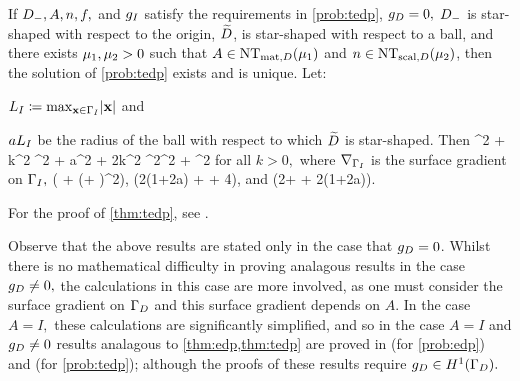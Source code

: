 \label{thm:tedp}
If $D_{-}, A, n, f,$ and $g_{I}$ satisfy the requirements in \cref{prob:tedp}, $g_{D} = 0,$ $D_{-}$ is star-shaped with respect to the origin, $\widetilde{D}$, is star-shaped with respect to a ball, and there exists $\mu_{1}, \mu_{2} > 0$ such that $A \in \NTAD{\muo}$ and $n \in \NTnD{\mut}$, then the solution of \cref{prob:tedp} exists and is unique. Let:
\bit
\item $\LI \de \max_{\bx \in \GI} \abs{\bx}$ and
\item $aL_{I}$ be the radius of the ball with respect to which $\widetilde{D}$ is star-shaped.
    \eit
Then
\beq\label{eq:tedpbound}
  \muo {}^2 + \mut k^2 ^2 + a\LI{}^2 + 2\LI k^2 ^2\leq \Ct {}^2 + \Cttilde \NLtGI{\gI}^2
\eeq
for all $k>0,$ where $\nabla_{\Gamma_{I}}$ is the surface gradient on $\Gamma_{I},$
\beqs
\Ct {}\mleft( + \mleft(\beta + \mright)^2\mright),
\eeqs
\beqs
\Cttilde {}\mleft(2\mleft(1+\frac2a\mright) + \frac\beta{\LI} + 4\mright)\LI,
\eeqs
and
\beqs
\beta \de \LI \mleft(2+ + 2\mleft(1+\frac2a\mright)\mright).
\eeqs
\enth

For the proof of \cref{thm:tedp}, see \cite[Theorem A.6 (i)]{GrPeSp:19}.

Observe that the above results are stated only in the case that $g_{D} = 0$. Whilst there is no mathematical difficulty in proving analagous results in the case $g_{D} \neq 0,$ the calculations in this case are more involved, as one must consider the surface gradient on $\Gamma_{D}$  and this surface gradient depends on $A.$ In the case $A=I,$ these calculations are significantly simplified, and so in the case $A=I$ and $g_{D} \neq 0$ results analagous to \cref{thm:edp,thm:tedp} are proved in \cite[Theorem 2.19(ii)]{GrPeSp:19} (for \cref{prob:edp}) and \cite[Theorem A.6(iv)]{GrPeSp:19} (for \cref{prob:tedp}); although the proofs of these results require $\gD \in \HoGD.$

